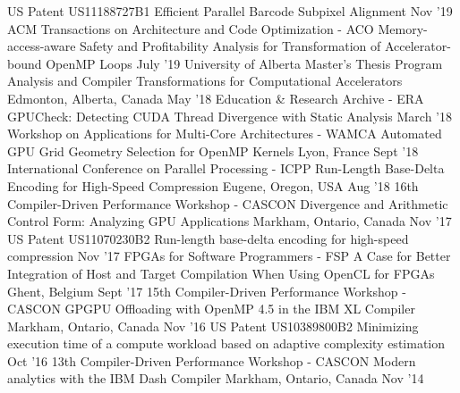 \begin{cventries}
\publication
  {US Patent US11188727B1}
  {Efficient Parallel Barcode Subpixel Alignment}
  {}
  {Nov '19}
\publication
  {ACM Transactions on Architecture and Code Optimization - ACO}
  {Memory-access-aware Safety and Profitability Analysis for Transformation of Accelerator-bound OpenMP Loops}
  {}
  {July '19}
\publication
  {University of Alberta Master's Thesis}
  {Program Analysis and Compiler Transformations for Computational Accelerators}
  {Edmonton, Alberta, Canada}
  {May '18}
\publication
  {Education \& Research Archive - ERA}
  {GPUCheck: Detecting CUDA Thread Divergence with Static Analysis}
  {}
  {March '18}
\publication
  {Workshop on Applications for Multi-Core Architectures - WAMCA}
  {Automated GPU Grid Geometry Selection for OpenMP Kernels}
  {Lyon, France}
  {Sept '18}
\publication
  {International Conference on Parallel Processing - ICPP}
  {Run-Length Base-Delta Encoding for High-Speed Compression}
  {Eugene, Oregon, USA}
  {Aug '18}
\presentation
  {16th Compiler-Driven Performance Workshop - CASCON}
  {Divergence and Arithmetic Control Form: Analyzing GPU Applications}
  {Markham, Ontario, Canada}
  {Nov '17}
\publication
  {US Patent US11070230B2}
  {Run-length base-delta encoding for high-speed compression}
  {}
  {Nov '17}
\publication
  {FPGAs for Software Programmers - FSP}
  {A Case for Better Integration of Host and Target Compilation When Using OpenCL for FPGAs}
  {Ghent, Belgium}
  {Sept '17}
\presentation
  {15th Compiler-Driven Performance Workshop - CASCON}
  {GPGPU Offloading with OpenMP 4.5 in the IBM XL Compiler}
  {Markham, Ontario, Canada}
  {Nov '16}
\publication
  {US Patent US10389800B2}
  {Minimizing execution time of a compute workload based on adaptive complexity estimation}
  {}
  {Oct '16}
\presentation
  {13th Compiler-Driven Performance Workshop - CASCON}
  {Modern analytics with the IBM Dash Compiler}
  {Markham, Ontario, Canada}
  {Nov '14}
\end{cventries}
